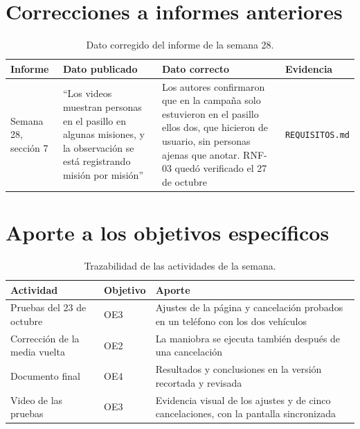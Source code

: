 \documentclass[12pt,letterpaper]{article}
\begin{document}
\section{Correcciones a informes anteriores}
\label{sec:correcciones}

\begin{table}[H]
\centering
\small
\caption{Dato corregido del informe de la semana 28.}
\begin{tabular}{@{}p{2.2cm}p{4.9cm}p{5.6cm}p{2.5cm}@{}}
\toprule
\textbf{Informe} & \textbf{Dato publicado} & \textbf{Dato correcto} & \textbf{Evidencia} \\ \midrule
Semana 28, sección 7 & ``Los videos muestran personas en el pasillo en algunas misiones, y la observación se está registrando misión por misión'' & Los autores confirmaron que en la campaña solo estuvieron en el pasillo ellos dos, que hicieron de usuario, sin personas ajenas que anotar. RNF-03 quedó verificado el 27 de octubre & \texttt{REQUISITOS.md} \\ \bottomrule
\end{tabular}
\end{table}

\section{Aporte a los objetivos específicos}

\begin{table}[H]
\centering
\small
\caption{Trazabilidad de las actividades de la semana.}
\begin{tabular}{@{}p{5.2cm}p{1.6cm}p{8.6cm}@{}}
\toprule
\textbf{Actividad} & \textbf{Objetivo} & \textbf{Aporte} \\ \midrule
Pruebas del 23 de octubre & OE3 & Ajustes de la página y cancelación probados en un teléfono con los dos vehículos \\
Corrección de la media vuelta & OE2 & La maniobra se ejecuta también después de una cancelación \\
Documento final & OE4 & Resultados y conclusiones en la versión recortada y revisada \\
Video de las pruebas & OE3 & Evidencia visual de los ajustes y de cinco cancelaciones, con la pantalla sincronizada \\ \bottomrule
\end{tabular}
\end{table}
\end{document}
